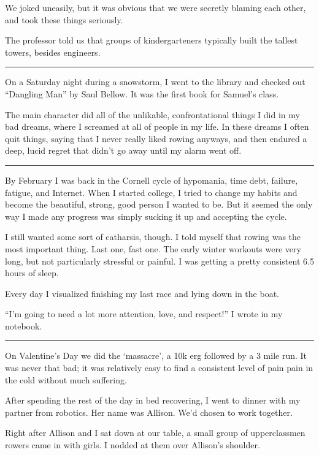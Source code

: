 We joked uneasily, but it was obvious that we were secretly blaming each other,
and took these things seriously.

The professor told us that groups of kindergarteners typically built the tallest
towers, besides engineers.

\plainfancybreak{12pt}{2}{* * *}

On a Saturday night during a snowstorm, I went to the library and checked out
``Dangling Man'' by Saul Bellow.  It was the first book for Samuel's class.

The main character did all of the unlikable, confrontational things I did in my
bad dreams, where I screamed at all of people in my life.  In these dreams I
often quit things, saying that I never really liked rowing anyways, and then
endured a deep, lucid regret that didn't go away until my alarm went off.

\plainfancybreak{12pt}{2}{* * *}

By February I was back in the Cornell cycle of hypomania, time debt, failure,
fatigue, and Internet.  When I started college, I tried to change my habits and
become the beautiful, strong, good person I wanted to be.  But it seemed the
only way I made any progress was simply sucking it up and accepting the cycle.

I still wanted some sort of catharsis, though.  I told myself that rowing was
the most important thing.  Last one, fast one.  The early winter workouts were
very long, but not particularly stressful or painful.  I was getting a pretty
consistent 6.5 hours of sleep.

Every day I visualized finishing my last race and lying down in the boat.

``I'm going to need a lot more attention, love, and respect!'' I wrote in my
notebook. 

\plainfancybreak{12pt}{2}{* * *}

On Valentine's Day we did the `massacre', a 10k erg followed by a 3 mile run.
It was never that bad; it was relatively easy to find a consistent level of pain
pain in the cold without much suffering.  

After spending the rest of the day in bed recovering, I went to dinner with my
partner from robotics.  Her name was Allison.  We'd chosen to work together.  

Right after Allison and I sat down at our table, a small group of upperclassmen
rowers came in with girls.  I nodded at them over Allison's shoulder.  

